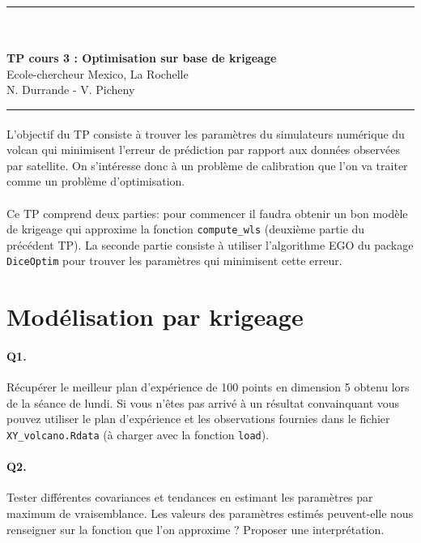 \documentclass[12pt]{scrartcl}
\begin{document}
\begin{center}
	\rule{\textwidth}{1pt}
	\\ \ \\
	{\LARGE \textbf{TP cours 3 : Optimisation sur base de krigeage}}\\
	\vspace{3mm}
	{\large Ecole-chercheur Mexico, La Rochelle \\ \vspace{3mm}}
	{\normalsize N. Durrande - V. Picheny}\\
	\vspace{3mm}
	\rule{\textwidth}{1pt}
	\vspace{5mm}
\end{center}
\paragraph{}
L'objectif du TP consiste à trouver les paramètres du simulateurs numérique du volcan qui minimisent l'erreur de prédiction par rapport aux données observées par satellite. On s'intéresse donc à un problème de calibration que l'on va traiter comme un problème d'optimisation.
\paragraph{}
Ce TP comprend deux parties: pour commencer il faudra obtenir un bon modèle de krigeage qui approxime la fonction \texttt{compute\_wls} (deuxième partie du précédent TP). La seconde partie consiste à utiliser l'algorithme EGO du package \texttt{DiceOptim} pour trouver les paramètres qui minimisent cette erreur.

\section{Modélisation par krigeage}

\paragraph{Q1.} Récupérer le meilleur plan d'expérience de 100 points en dimension 5 obtenu lors de la séance de lundi. 
Si vous n'êtes pas arrivé à un résultat convainquant vous pouvez utiliser le plan d'expérience et les observations fournies dans le fichier \texttt{XY\_volcano.Rdata} (à charger avec la fonction \texttt{load}).

\paragraph{Q2.} Tester différentes covariances et tendances en estimant les paramètres par maximum de vraisemblance. Les valeurs des paramètres estimés peuvent-elle nous renseigner sur la fonction que l'on approxime ? Proposer une interprétation.
\end{document}
